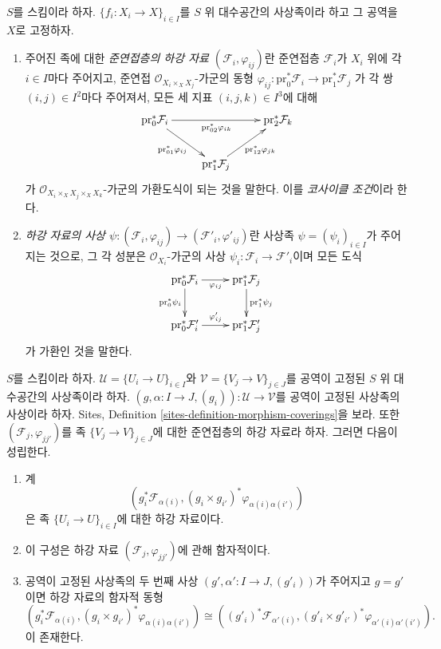 \begin{definition}
\label{definition-descent-datum-quasi-coherent}
$S$를 스킴이라 하자. $\{f_i : X_i \to X\}_{i \in I}$를 $S$ 위
대수공간의 사상족이라 하고 그 공역을 $X$로 고정하자.
\begin{enumerate}
\item 주어진 족에 대한 {\it 준연접층의 하강 자료
$(\mathcal{F}_i, \varphi_{ij})$}란 준연접층 $\mathcal{F}_i$가 $X_i$ 위에
각 $i \in I$마다 주어지고, 준연접
$\mathcal{O}_{X_i \times_X X_j}$-가군의 동형
$\varphi_{ij} : \text{pr}_0^*\mathcal{F}_i \to \text{pr}_1^*\mathcal{F}_j$
가 각 쌍 $(i,j) \in I^2$마다 주어져서, 모든 세 지표
$(i,j,k) \in I^3$에 대해
$$
\xymatrix{
\text{pr}_0^*\mathcal{F}_i \ar[rd]_{\text{pr}_{01}^*\varphi_{ij}}
\ar[rr]_{\text{pr}_{02}^*\varphi_{ik}} & &
\text{pr}_2^*\mathcal{F}_k \\
& \text{pr}_1^*\mathcal{F}_j \ar[ru]_{\text{pr}_{12}^*\varphi_{jk}} &
}
$$
가 $\mathcal{O}_{X_i \times_X X_j \times_X X_k}$-가군의 가환도식이 되는
것을 말한다. 이를 {\it 코사이클 조건}이라 한다.
\item {\it 하강 자료의 사상
$\psi : (\mathcal{F}_i, \varphi_{ij}) \to
(\mathcal{F}'_i, \varphi'_{ij})$}란 사상족
$\psi=(\psi_i)_{i\in I}$가 주어지는 것으로, 그 각 성분은
$\mathcal{O}_{X_i}$-가군의 사상
$\psi_i : \mathcal{F}_i \to \mathcal{F}'_i$이며 모든 도식
$$
\xymatrix{
\text{pr}_0^*\mathcal{F}_i \ar[r]_{\varphi_{ij}} \ar[d]_{\text{pr}_0^*\psi_i}
& \text{pr}_1^*\mathcal{F}_j \ar[d]^{\text{pr}_1^*\psi_j} \\
\text{pr}_0^*\mathcal{F}'_i \ar[r]^{\varphi'_{ij}} &
\text{pr}_1^*\mathcal{F}'_j \\
}
$$
가 가환인 것을 말한다.
\end{enumerate}
\end{definition}







\begin{lemma}
\label{lemma-map-families}
$S$를 스킴이라 하자. $\mathcal{U}=\{U_i\to U\}_{i\in I}$와
$\mathcal{V}=\{V_j\to V\}_{j\in J}$를 공역이 고정된 $S$ 위 대수공간의
사상족이라 하자. $(g,\alpha:I\to J,(g_i)):\mathcal{U}\to\mathcal{V}$를
공역이 고정된 사상족의 사상이라 하자. Sites, Definition
\ref{sites-definition-morphism-coverings}을 보라. 또한
$(\mathcal{F}_j,\varphi_{jj'})$를 족 $\{V_j\to V\}_{j\in J}$에 대한
준연접층의 하강 자료라 하자. 그러면 다음이 성립한다.
\begin{enumerate}
\item 계
$$
\left(g_i^*\mathcal{F}_{\alpha(i)},
(g_i \times g_{i'})^*\varphi_{\alpha(i)\alpha(i')}\right)
$$
은 족 $\{U_i\to U\}_{i\in I}$에 대한 하강 자료이다.
\item 이 구성은 하강 자료 $(\mathcal{F}_j,\varphi_{jj'})$에 관해
함자적이다.
\item 공역이 고정된 사상족의 두 번째 사상
$(g',\alpha':I\to J,(g'_i))$가 주어지고 $g=g'$이면 하강 자료의 함자적
동형
$$
(g_i^*\mathcal{F}_{\alpha(i)},
(g_i \times g_{i'})^*\varphi_{\alpha(i)\alpha(i')})
\cong
((g'_i)^*\mathcal{F}_{\alpha'(i)},
(g'_i \times g'_{i'})^*\varphi_{\alpha'(i)\alpha'(i')}).
$$
이 존재한다.
\end{enumerate}
\end{lemma}

